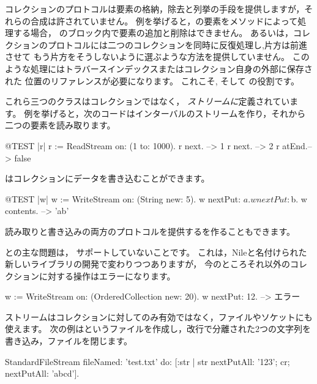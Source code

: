 \documentclass[a4paper,10pt,twoside]{book}
\begin{document}
コレクションのプロトコルは要素の格納，除去と列挙の手段を提供しますが，それらの合成は許されていません。
例を挙げると，の要素をメソッドによって処理する場合，
のブロック内で要素の追加と削除はできません。
あるいは，コレクションのプロトコルには二つのコレクションを同時に反復処理し,片方は前進させて
もう片方をそうしないように選ぶような方法を提供していません。
このような処理にはトラバースインデックスまたはコレクション自身の外部に保存された
位置のリファレンスが必要になります。
これこそ,   そして の役割です。



これら三つのクラスはコレクションではなく， \emph{ストリームに}定義されています。
例を挙げると，次のコードはインターバルのストリームを作り，それから二つの要素を読み取ります。


\begin{code}{@TEST |r|}
r := ReadStream on: (1 to: 1000).
r next.   --> 1
r next.   --> 2
r atEnd.--> false
\end{code}

はコレクションにデータを書き込むことができます。


\begin{code}{@TEST |w|}
w := WriteStream on: (String new: 5).
w nextPut: $a.
w nextPut: $b.
w contents. -->  'ab'
\end{code}

読み取りと書き込みの両方のプロトコルを提供するを作ることもできます。

との主な問題は，
サポートしていないことです。
これは，Nileと名付けられた新しいライブラリの開発で変わりつつありますが，
今のところそれ以外のコレクションに対する操作はエラーになります。

\begin{code}{}
w := WriteStream on: (OrderedCollection new: 20).
w nextPut: 12. -->  エラー
\end{code}

ストリームはコレクションに対してのみ有効ではなく，ファイルやソケットにも使えます。
次の例はというファイルを作成し，改行で分離された2つの文字列を書き込み，ファイルを閉じます。

\begin{code}{}
StandardFileStream
  fileNamed: 'test.txt'
  do: [:str | str
                nextPutAll: '123';
                cr;
                nextPutAll: 'abcd'].
\end{code}
\end{document}
